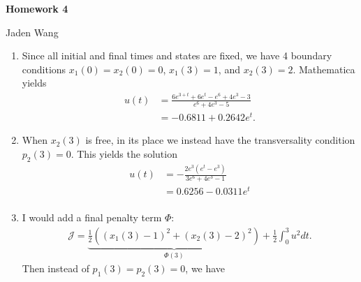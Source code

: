 \documentclass[12pt]{article}
\begin{document}
\centerline {\textsf{\textbf{\LARGE{Homework 4}}}}
\centerline {Jaden Wang}
\vspace{.15in}
\begin{problem}[1]
\begin{enumerate}[label=(\alph*)]
The Hamiltonian of the problem is given by
\begin{align*}
	H(x_1,x_2,u,p_1,p_2) = \frac{1}{2} u ^2+ p_1x_2+p_2(u-x_2). 
\end{align*}
The adjoint equations are given by
\begin{align*}
	\dot{p_1} &= -H_{x_1} = 0 \\
	\dot{p_2} &= -H_{x_2} = p_2-p_1
\end{align*}
The first-order condition demands
\begin{align*}
	H_u = u+p_2 &= 0\\
	u&= -p_2 
\end{align*}
Plugging this into the differential equations yield
\begin{align*}
	\dot{x_1} &= x_2 \\
	\dot{x_2} &= -x_2-p_2 \\
\end{align*}
Together with the adjoint equations, we have 4 first-order equations and require 4 boundary conditions.
\item Since all initial and final times and states are fixed, we have 4 boundary conditions $ x_1(0)=x_2(0)=0$, $ x_1(3)=1$, and $ x_2(3)=2$. Mathematica yields
\begin{align*}
	u(t) &= \frac{6e^{3+t}+6e^{t}-e^{6}+4e^{3}-3}{e^{6}+4e^{3}-5}\\
	&=-0.6811 + 0.2642 e^{t}.
\end{align*}
\item When $ x_2(3)$ is free, in its place we instead have the transversality condition $ p_2(3) = 0$. This yields the solution
\begin{align*}
	u(t) &= -\frac{2e^3(e^{t}-e^{3})}{3e^{6}+4e^3-1 }\\
	&= 0.6256 - 0.0311e^{t} \\
\end{align*}
\item I would add a final penalty term $ \Phi$:
\begin{align*}
	\mathcal{ J} = \underbrace{ \frac{1}{2} \left( (x_1(3)-1)^2+(x_2(3)-2)^2 \right)  }_{\Phi(3) } + \frac{1}{2} \int_0^3 u^2 dt .
\end{align*}
Then instead of $ p_1(3)=p_2(3)=0$, we have
\begin{align*}

\end{align*}
\end{enumerate}
\end{problem}
\end{document}
